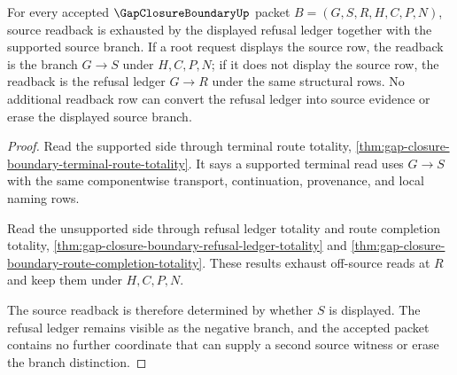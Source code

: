 \begin{theorem}
\label{thm:gap-closure-boundary-source-readback}
For every accepted $\GapClosureBoundaryUp$ packet $B=(G,S,R,H,C,P,N)$, source readback is exhausted by the displayed refusal ledger together with the supported source branch. If a root request displays the source row, the readback is the branch $G \longrightarrow S$ under $H,C,P,N$; if it does not display the source row, the readback is the refusal ledger $G \longrightarrow R$ under the same structural rows. No additional readback row can convert the refusal ledger into source evidence or erase the displayed source branch.
\end{theorem}
\begin{proof}
Read the supported side through terminal route totality, \autoref{thm:gap-closure-boundary-terminal-route-totality}. It says a supported terminal read uses $G \longrightarrow S$ with the same componentwise transport, continuation, provenance, and local naming rows.

Read the unsupported side through refusal ledger totality and route completion totality, \autoref{thm:gap-closure-boundary-refusal-ledger-totality} and \autoref{thm:gap-closure-boundary-route-completion-totality}. These results exhaust off-source reads at $R$ and keep them under $H,C,P,N$.

The source readback is therefore determined by whether $S$ is displayed. The refusal ledger remains visible as the negative branch, and the accepted packet contains no further coordinate that can supply a second source witness or erase the branch distinction.
\end{proof}

